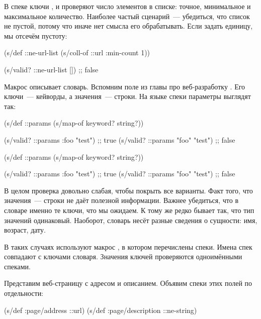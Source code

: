 В спеке  ключи ,  и
 проверяют число элементов в списке: точное, минимальное и
максимальное количество. Наиболее частый сценарий~--- убедиться, что список не
пустой, потому что иначе нет смысла его обрабатывать. Если задать
 единицу, мы отсечём пустоту:


\begin{clojure}
(s/def ::ne-url-list
  (s/coll-of ::url :min-count 1))

(s/valid? ::ne-url-list [])
;; false
\end{clojure}



Макрос  описывает словарь. Вспомним поле  из
главы про веб-разработку . Его ключи~--- кейворды, а значения~---
строки. На языке спеки параметры выглядят так:

\ifnarrow


\begin{clojure}
(s/def ::params
  (s/map-of keyword? string?))

(s/valid? ::params
  {:foo "test"})  ;; true
(s/valid? ::params
  {"foo" "test"}) ;; false
\end{clojure}


\else


\begin{clojure}
(s/def ::params
  (s/map-of keyword? string?))

(s/valid? ::params {:foo "test"})  ;; true
(s/valid? ::params {"foo" "test"}) ;; false
\end{clojure}


\fi

В целом проверка  довольно слабая, чтобы покрыть все
варианты. Факт того, что значения~--- строки не даёт полезной информации. Важнее
убедиться, что в словаре именно те ключи, что мы ожидаем. К тому же редко бывает
так, что тип значений одинаковый. Наоборот, словарь несёт разные сведения о
сущности: имя, возраст, дату.


В таких случаях используют макрос , в котором перечислены
спеки. Имена спек совпадают с ключами словаря. Значения ключей проверяются
одноимёнными спеками.

Представим веб-страницу с адресом и описанием. Объявим спеки этих полей по
отдельности:


\begin{clojure}
(s/def :page/address ::url)
(s/def :page/description ::ne-string)
\end{clojure}


